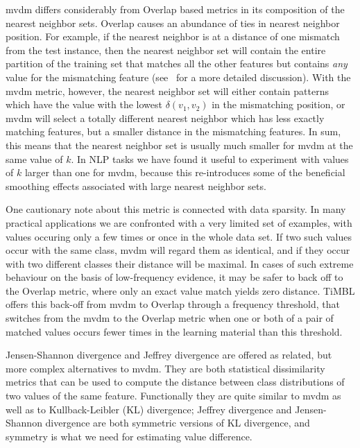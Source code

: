 \documentclass{book}
\begin{document}
{\sc mvdm} differs considerably from Overlap based metrics in its
composition of the nearest neighbor sets. Overlap causes an abundance
of ties in nearest neighbor position. For example, if the nearest
neighbor is at a distance of one mismatch from the test instance, then
the nearest neighbor set will contain the entire partition of the
training set that matches all the other features but contains {\em
any} value for the mismatching feature (see~ for a
more detailed discussion). With the {\sc mvdm} metric, however, the
nearest neighbor set will either contain patterns which have the value
with the lowest $\delta(v_{1}, v_{2})$ in the mismatching position, or
{\sc mvdm} will select a totally different nearest neighbor which has
less exactly matching features, but a smaller distance in the
mismatching features. In sum, this means that the nearest neighbor set
is usually much smaller for {\sc mvdm} at the same value of $k$. In
NLP tasks we have found it useful to experiment with values of
$k$ larger than one for {\sc mvdm}, because this re-introduces some of
the beneficial smoothing effects associated with large nearest
neighbor sets.

One cautionary note about this metric is connected with data
sparsity. In many practical applications we are confronted with a
very limited set of examples, with values occuring only a few times or
once in the whole data set. If two such values occur with the same
class, {\sc mvdm} will regard them as identical, and if they occur
with two different classes their distance will be maximal. In cases of
such extreme behaviour on the basis of low-frequency evidence, it may
be safer to back off to the Overlap metric, where only an exact value
match yields zero distance. TiMBL offers this back-off from {\sc mvdm}
to Overlap through a frequency threshold, that switches from the {\sc
mvdm} to the Overlap metric when one or both of a pair of matched
values occurs fewer times in the learning material than this
threshold.

Jensen-Shannon divergence and Jeffrey divergence are offered as
related, but more complex alternatives to {\sc mvdm}. They are both
statistical dissimilarity metrics that can be used to compute the
distance between class distributions of two values of the same
feature. Functionally they are quite similar to {\sc
  mvdm} as well as to Kullback-Leibler (KL) divergence; Jeffrey divergence
and Jensen-Shannon divergence are both symmetric versions of KL
divergence, and symmetry is what we need for estimating value difference.
\end{document}
